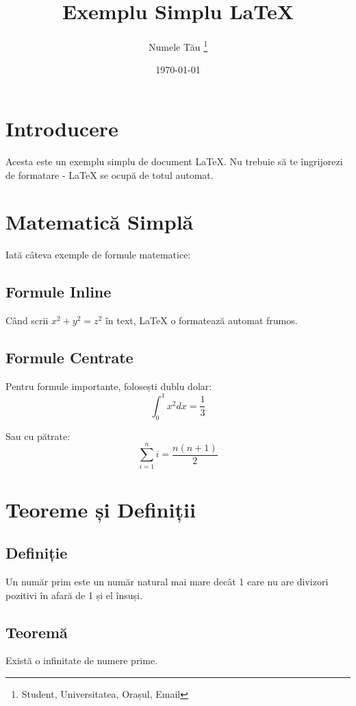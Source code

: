 \documentclass[journal,noindent,headline,twoside,indent,a4paper,12pt]{paper_RDMI}
\begin{document}
\title{Exemplu Simplu LaTeX}
\author{Numele Tău
\thanks{Student, Universitatea, Orașul, Email}}
\institution{}
\date{\today}
\maketitle

\section{Introducere}
Acesta este un exemplu simplu de document LaTeX. Nu trebuie să te îngrijorezi de formatare - LaTeX se ocupă de totul automat.

\section{Matematică Simplă}
Iată câteva exemple de formule matematice:

\subsection{Formule Inline}
Când scrii $x^2 + y^2 = z^2$ în text, LaTeX o formatează automat frumos.

\subsection{Formule Centrate}
Pentru formule importante, folosești dublu dolar:
$$\int_{0}^{1} x^2 dx = \frac{1}{3}$$

Sau cu pătrate:
$$\sum_{i=1}^{n} i = \frac{n(n+1)}{2}$$

\section{Teoreme și Definiții}
\subsection{Definiție}
\begin{defi}
Un număr prim este un număr natural mai mare decât 1 care nu are divizori pozitivi în afară de 1 și el însuși.
\end{defi}

\subsection{Teoremă}
\begin{teo}
Există o infinitate de numere prime.
\end{teo}
\end{document}
